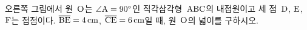 \noindent\begin{minipage}[t]{0.58\linewidth}\vspace{0pt}\raggedright 오른쪽 그림에서 원~$\mathrm{O}$는 $\angle\mathrm{A}=90^\circ$인 직각삼각형~$\mathrm{ABC}$의 내접원이고 세 점~$\mathrm{D}$, $\mathrm{E}$, $\mathrm{F}$는 접점이다. $\overline{\mathrm{BE}}=4\,\mathrm{cm}$, $\overline{\mathrm{CE}}=6\,\mathrm{cm}$일 때, 원~$\mathrm{O}$의 넓이를 구하시오.\end{minipage}\hfill\begin{minipage}[t]{0.4\linewidth}\vspace{0pt}\centering \resizebox{\ifdim\width>\linewidth\linewidth\else\width\fi}{!}{}\end{minipage}\par
